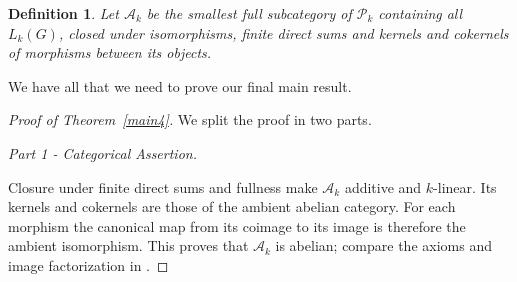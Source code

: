 \documentclass{amsart}
\newtheorem{definition}[theorem]{Definition}
\begin{document}
\begin{definition}\label{def:ak}
Let $\mathcal A_k$ be the smallest full subcategory of $\mathcal P_k$ containing all $L_k(G)$, closed under isomorphisms, finite direct sums  and kernels and cokernels of morphisms between its objects.
\end{definition}

We have all that we need to prove our final main result.

\begin{proof}[Proof of Theorem~\ref{main4}] We split the proof in two parts.

\medskip

\textit{Part 1 - Categorical Assertion.} 

\medskip

Closure under finite direct sums and fullness make $\mathcal A_k$ additive and $k$-linear. Its kernels and cokernels are those of the ambient abelian category. For each morphism the canonical map from its coimage to its image is therefore the ambient isomorphism. This proves that $\mathcal A_k$ is abelian; compare the axioms and image factorization in \cite[Section~VIII.3, pp.~198--200]{maclane1998categories}.


\end{proof}
\end{document}
